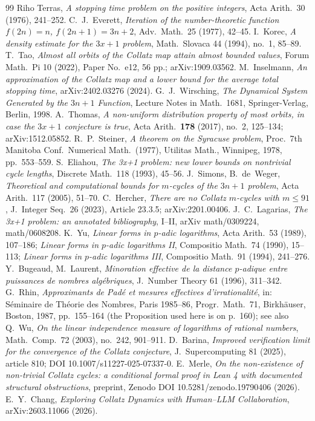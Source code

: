 \documentclass[11pt]{article}
\theoremstyle{remark}
\begin{document}
\begin{thebibliography}{99}
\small
{} Riho Terras, \emph{A stopping time problem on the positive integers}, Acta Arith.\ 30 (1976), 241--252.
 C.~J.~Everett, \emph{Iteration of the number-theoretic function
  $f(2n) = n$, $f(2n+1) = 3n+2$}, Adv.\ Math.\ 25 (1977), 42--45.
 I.~Korec, \emph{A density estimate for the $3x+1$ problem},
  Math.\ Slovaca 44 (1994), no.\ 1, 85--89.
 T.~Tao, \emph{Almost all orbits of the Collatz map attain almost
  bounded values}, Forum Math.\ Pi 10 (2022), Paper No.\ e12, 56 pp.;
  arXiv:1909.03562.
 M.~Inselmann, \emph{An approximation of the Collatz map and a
  lower bound for the average total stopping time}, arXiv:2402.03276 (2024).
 G.~J.~Wirsching, \emph{The Dynamical System Generated by the
  $3n+1$ Function}, Lecture Notes in Math.\ 1681, Springer-Verlag, Berlin, 1998.
 A.~Thomas, \emph{A non-uniform distribution property of most
  orbits, in case the $3x+1$ conjecture is true}, Acta Arith.\ \textbf{178}
  (2017), no.~2, 125--134; arXiv:1512.05852.
 R.~P.~Steiner, \emph{A theorem on the Syracuse problem}, Proc.\ 7th Manitoba Conf.\ Numerical Math.\ (1977), Utilitas Math., Winnipeg, 1978, pp.\ 553--559.
 S.~Eliahou, \emph{The 3x+1 problem: new lower bounds on nontrivial cycle lengths}, Discrete Math.\ 118 (1993), 45--56.
 J.~Simons, B.~de~Weger, \emph{Theoretical and computational bounds for $m$-cycles of the $3n+1$ problem}, Acta Arith.\ 117 (2005), 51--70.
 C.~Hercher, \emph{There are no Collatz $m$-cycles with $m \le 91$}, J.\ Integer Seq.\ 26 (2023), Article 23.3.5; arXiv:2201.00406.
 J.~C.~Lagarias, \emph{The 3x+1 problem: an annotated bibliography}, I--II, arXiv math/0309224, math/0608208.
 K.~Yu, \emph{Linear forms in $p$-adic logarithms}, Acta Arith.\ 53 (1989), 107--186; \emph{Linear forms in $p$-adic logarithms II}, Compositio Math.\ 74 (1990), 15--113; \emph{Linear forms in $p$-adic logarithms III}, Compositio Math.\ 91 (1994), 241--276.
 Y.~Bugeaud, M.~Laurent, \emph{Minoration effective de la distance $p$-adique entre puissances de nombres alg\'ebriques}, J.\ Number Theory 61 (1996), 311--342.
 G.~Rhin, \emph{Approximants de Pad\'e et mesures effectives d'irrationalit\'e}, in: S\'eminaire de Th\'eorie des Nombres, Paris 1985--86, Progr.\ Math.\ 71, Birkh\"auser, Boston, 1987, pp.\ 155--164 (the Proposition used here is on p.~160); see also Q.~Wu, \emph{On the linear independence measure of logarithms of rational numbers}, Math.\ Comp.\ 72 (2003), no.\ 242, 901--911.
 D.~Barina, \emph{Improved verification limit for the convergence of the Collatz conjecture}, J.\ Supercomputing 81 (2025), article 810; DOI 10.1007/s11227-025-07337-0.
 E.~Merle, \emph{On the non-existence of non-trivial Collatz cycles: a conditional formal proof in Lean 4 with documented structural obstructions}, preprint, Zenodo DOI 10.5281/zenodo.19790406 (2026).
 E.~Y.~Chang, \emph{Exploring Collatz Dynamics with Human--LLM Collaboration}, arXiv:2603.11066 (2026).
\end{thebibliography}
\end{document}

